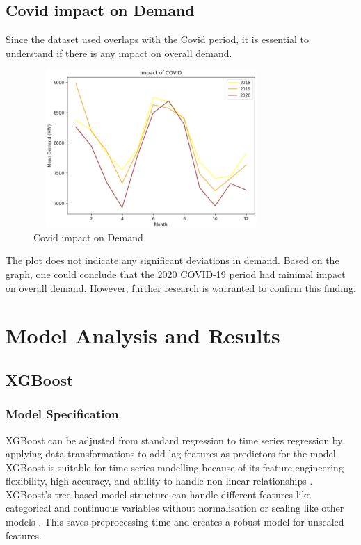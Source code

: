 \documentclass[mstat,12pt]{unswthesis}
\begin{document}
\hypertarget{covid-impact-on-demand}{%
\section{Covid impact on Demand}\label{covid-impact-on-demand}}

Since the dataset used overlaps with the Covid period, it is essential
to understand if there is any impact on overall demand.

\begin{figure}[H]
\centering
\includegraphics[width=0.80\textwidth,height=6cm]{covid_impact.png}
\caption{Covid impact on Demand}
\label{covid_impact}
\end{figure}

The plot does not indicate any significant deviations in demand. Based
on the graph, one could conclude that the 2020 COVID-19 period had
minimal impact on overall demand. However, further research is warranted
to confirm this finding.

\hypertarget{model-analysis-and-results}{%
\chapter{Model Analysis and Results}\label{model-analysis-and-results}}

\hypertarget{xgboost}{%
\section{XGBoost}\label{xgboost}}

\hypertarget{model-specification}{%
\subsection{Model Specification}\label{model-specification}}

XGBoost can be adjusted from standard regression to time series
regression by applying data transformations to add lag features as
predictors for the model. XGBoost is suitable for time series modelling
because of its feature engineering flexibility, high accuracy, and
ability to handle non-linear relationships
\cite{brownlee_gradientboosting2020}. XGBoost's tree-based model
structure can handle different features like categorical and continuous
variables without normalisation or scaling like other models
\cite{ambika_2023_xgboost}. This saves preprocessing time and creates a
robust model for unscaled features.
\end{document}
